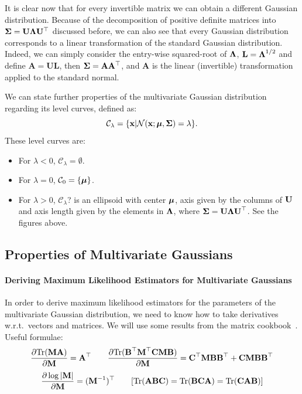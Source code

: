 It is clear now that for every invertible matrix we can obtain a different Gaussian distribution. Because of the decomposition of positive definite matrices into $\boldsymbol{\mathbf{\Sigma}}=\mathbf{U}\boldsymbol{\mathbf{\Lambda}}\mathbf{U}^\top$ discussed before, we can also see that every Gaussian distribution corresponds to a linear transformation of the standard Gaussian distribution. Indeed, we can simply consider the entry-wise squared-root of $\boldsymbol{\mathbf{\Lambda}}$, $\mathbf{L}=\boldsymbol{\mathbf{\Lambda}}^{1/2}$ and define $\mathbf{A}=\mathbf{U}\mathbf{L}$, then $\boldsymbol{\mathbf{\Sigma}}=\mathbf{A}\mathbf{A}^\top$, and $\mathbf{A}$ is the linear (invertible) transformation applied to the standard normal.

We can state further properties of the multivariate Gaussian distribution regarding its level curves, defined as:
\begin{equation}
\mathcal{C}_\lambda = \{\boldsymbol{\mathbf{x}}|\mathcal{N}(\boldsymbol{\mathbf{x}};\boldsymbol{\mathbf{\mu}},\boldsymbol{\mathbf{\Sigma}})=\lambda\}. 
\end{equation}
These level curves are:
\begin{itemize}
    \item For $\lambda<0$, $\mathcal{C}_\lambda = \emptyset$.
    \item For $\lambda=0$, $\mathcal{C}_0=\{\boldsymbol{\mathbf{\mu}}\}$.
    \item For $\lambda>0$, $\mathcal{C}_\lambda$? is an ellipsoid with center $\boldsymbol{\mathbf{\mu}}$, axis given by the columns of $\boldsymbol{\mathbf{U}}$ and axis length given by the elements in $\boldsymbol{\mathbf{\Lambda}}$, where $\boldsymbol{\mathbf{\Sigma}}=\boldsymbol{\mathbf{U}}\boldsymbol{\mathbf{\Lambda}}\boldsymbol{\mathbf{U}}^\top$. See the figures above.
\end{itemize}

\subsection{Properties of Multivariate Gaussians}

\paragraph{Deriving Maximum Likelihood Estimators for Multivariate Gaussians} In order to derive maximum likelihood estimators for the parameters of the multivariate Gaussian distribution, we need to know how to take derivatives w.r.t.\ vectors and matrices. We will use some results from the matrix cookbook~\cite{matrix-cookbook}. Useful formulae:
\begin{equation}
\frac{\partial \textrm{Tr}(\boldsymbol{\mathbf{M}}\boldsymbol{\mathbf{A}})}{\partial\boldsymbol{\mathbf{M}}}=\boldsymbol{\mathbf{A}}^\top \qquad \frac{\partial \textrm{Tr}(\boldsymbol{\mathbf{B}}^\top\boldsymbol{\mathbf{M}}^\top\boldsymbol{\mathbf{C}}\boldsymbol{\mathbf{M}}\boldsymbol{\mathbf{B}})}{\partial\boldsymbol{\mathbf{M}}}=\boldsymbol{\mathbf{C}}^\top\boldsymbol{\mathbf{M}}\boldsymbol{\mathbf{B}}\boldsymbol{\mathbf{B}}^\top+\boldsymbol{\mathbf{C}}\boldsymbol{\mathbf{M}}\boldsymbol{\mathbf{B}}\boldsymbol{\mathbf{B}}^\top
\end{equation} 
\begin{equation}
\frac{\partial \log|\boldsymbol{\mathbf{M}}|}{\partial\boldsymbol{\mathbf{M}}}=(\boldsymbol{\mathbf{M}}^{-1})^\top \qquad [\textrm{Tr}(\boldsymbol{\mathbf{A}}\boldsymbol{\mathbf{B}}\boldsymbol{\mathbf{C}}) = \textrm{Tr}(\boldsymbol{\mathbf{B}}\boldsymbol{\mathbf{C}}\boldsymbol{\mathbf{A}}) = \textrm{Tr}(\boldsymbol{\mathbf{C}}\boldsymbol{\mathbf{A}}\boldsymbol{\mathbf{B}})]
\end{equation}

